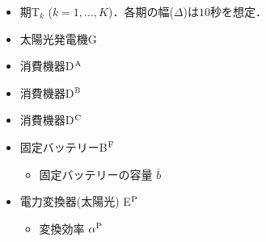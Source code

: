 \documentclass{jarticle}
\newcommand{\IB}{$\bullet$}
\newcommand{\IS}{$*$}
\begin{document}
\begin{itemize}
 \item[\IS] 期T$_k$ ($k=1,\ldots,K$)．各期の幅($\Delta$)は$10$秒を想定．
 \item[\IS] 太陽光発電機G
 \item[\IS] 消費機器D$^{\rm A}$
 \item[\IS] 消費機器D$^{\rm B}$
 \item[\IS] 消費機器D$^{\rm C}$
 \item[\IS] 固定バッテリーB$^{\rm F}$
  \begin{itemize}
   \item[\IB] 固定バッテリーの容量 $\overline{b}$
  \end{itemize}
 \item[\IS] 電力変換器(太陽光) E$^{\rm P}$
  \begin{itemize}
   \item[\IB] 変換効率 $\alpha^{\rm P}$


\end{itemize}
\end{itemize}
\end{document}
